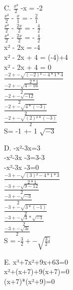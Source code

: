 \vspace{3mm} %

C. $\frac{x²}{2}$ -x = -2 \\

$\frac{x²}{2}$ - $\frac{x}{1}$ = - $\frac{2}{1}$\\

$\frac{x²}{2}$ - $\frac{2x}{2}$ = - $\frac{4}{2}$\\

$\frac{x²}{2}$ - $\frac{2x}{2}$ = - $\frac{4}{2}$\\

x² - 2x = -4 \\
x² - 2x + 4 = (-4)+4 \\
x² - 2x + 4 = 0 \\

$\frac{-2+-\sqrt{(-2)²-4*1*4}}{2*1}$ \\

$\frac{-2+-\sqrt{4 - 16}}{2}$ \\
$\frac{-2+-\sqrt{-12}}{2}$ \\
$\frac{-2+-\sqrt{4*(-3)}}{2}$ \\
$\frac{-2+-\sqrt{(2)²*(-3)}}{2}$ \\
S= -1 +- 1 $\sqrt{-3}$ \\


\vspace{3mm} %

D. -x²-3x=3 \\

-x²-3x -3=3-3 \\
-x²-3x -3=0 \\

$\frac{-3+-\sqrt{(3)²-4*1*3}}{2*1}$ \\

$\frac{-3+-\sqrt{9-12}}{2}$ \\
$\frac{-3+-\sqrt{-3}}{2}$ \\
$\frac{-3+-\sqrt{3 * (-1)}}{2}$ \\
$\frac{-3+-\sqrt{3} * \sqrt{-1}}{2}$ \\
$\frac{-3+-\sqrt{3i}}{2}$ \\
S = -$\frac{3}{2} +- \sqrt{\frac{3}{2}i}$ \\

\vspace{3mm} %

E. x³+7x²+9x+63=0 \\

x²+(x+7)+9(x+7)=0 \\
(x+7)*(x²+9)=0 \\

